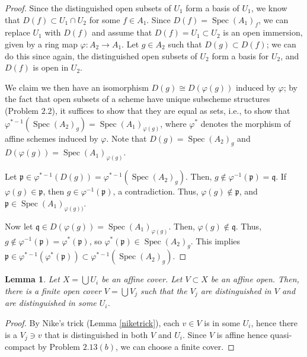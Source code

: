 \documentclass[12pt,letterpaper]{article}
\newtheorem{lemma}{Lemma}[section]
\theoremstyle{definition}
\theoremstyle{remark}
\numberwithin{equation}{section}
\numberwithin{figure}{problem}
\DeclareMathOperator{\Spec}{Spec}
\begin{document}
\begin{proof}
  Since the distinguished open subsets of $U_1$ form a basis of $U_1$, we know that $D(f) \subset U_1 \cap U_2$ for some $f \in A_1$. Since $D(f) = \Spec (A_1)_f$, we can replace $U_1$ with $D(f)$ and assume that $D(f) = U_1 \subset U_2$ is an open immersion, given by a ring map $\varphi\colon A_2 \to A_1$. Let $g \in A_2$ such that $D(g) \subset D(f)$; we can do this since again, the distinguished open subsets of $U_2$ form a basis for $U_2$, and $D(f)$ is open in $U_2$.
  \par We claim we then have an isomorphism $D(g) \cong D(\varphi(g))$ induced by $\varphi$; by the fact that open subsets of a scheme have unique subscheme structures (Problem $2.2$), it suffices to show that they are equal as sets, i.e., to show that $\varphi^{*-1}(\Spec(A_2)_g) = \Spec(A_1)_{\varphi(g)}$, where $\varphi^*$ denotes the morphism of affine schemes induced by $\varphi$. Note that $D(g) = \Spec (A_2)_g$ and $D(\varphi(g)) = \Spec(A_1)_{\varphi(g)}$.
  \par Let $\mathfrak{p} \in \varphi^{*-1}(D(g)) = \varphi^{*-1}(\Spec (A_2)_g)$. Then, $g \notin \varphi^{-1}(\mathfrak{p}) = \mathfrak{q}$. If $\varphi(g) \in \mathfrak{p}$, then $g \in \varphi^{-1}(\mathfrak{p})$, a contradiction. Thus, $\varphi(g) \notin \mathfrak{p}$, and $\mathfrak{p} \in \Spec (A_1)_{\varphi(g))}$.
  \par Now let $\mathfrak{q} \in D(\varphi(g)) = \Spec(A_1)_{\varphi(g)}$. Then, $\varphi(g) \notin \mathfrak{q}$. Thus, $g \notin \varphi^{-1}(\mathfrak{p}) = \varphi^*(\mathfrak{p})$, so $\varphi^*(\mathfrak{p}) \in \Spec(A_2)_g$. This implies $\mathfrak{p} \in \varphi^{*-1}(\varphi^*(\mathfrak{p})) \subset \varphi^{*-1}(\Spec (A_2)_g)$.
\end{proof}
\begin{lemma}\label{nikecor}
  Let $X = \bigcup U_i$ be an affine cover. Let $V \subset X$ be an affine open. Then, there is a finite open cover $V = \bigcup V_j$ such that the $V_j$ are distinguished in $V$ and are distinguished in some $U_i$.
\end{lemma}
\begin{proof}
  By Nike's trick (Lemma \ref{niketrick}), each $v \in V$ is in some $U_i$, hence there is a $V_j \ni v$ that is distinguished in both $V$ and $U_i$. Since $V$ is affine hence quasi-compact by Problem $2.13(b)$, we can choose a finite cover.
\end{proof}
\end{document}
